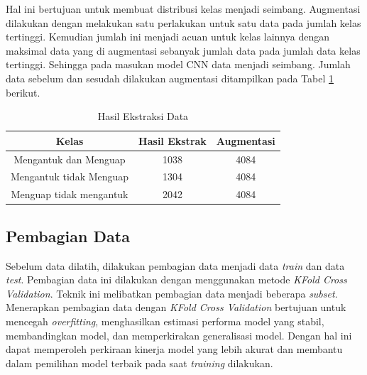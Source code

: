      
        
        Hal ini bertujuan untuk membuat distribusi kelas menjadi seimbang. Augmentasi dilakukan dengan melakukan satu perlakukan untuk satu data pada jumlah kelas tertinggi. Kemudian jumlah ini menjadi acuan untuk kelas lainnya dengan maksimal data yang di augmentasi sebanyak jumlah data pada jumlah data kelas tertinggi. Sehingga pada masukan model CNN data menjadi seimbang. Jumlah data sebelum dan sesudah dilakukan augmentasi ditampilkan pada Tabel \ref{Hasil Augmentasi Data} berikut.
    


            \begin{table}[H]
            \centering
            \caption{Hasil Ekstraksi Data}
            \begin{tabular}{ccc}
                \toprule
                \textbf{Kelas} & \textbf{Hasil Ekstrak} & \textbf{Augmentasi }\\
                \midrule
                      
                           Mengantuk dan Menguap & 1038 & 4084 \\
                          Mengantuk tidak Menguap & 1304 & 4084 \\
                           Menguap tidak mengantuk& 2042 & 4084 \\
                
                    \bottomrule
                \end{tabular}
                \label{Hasil Augmentasi Data}
            \end{table}




    
    \subsection{Pembagian Data}
    
    Sebelum data dilatih, dilakukan pembagian data menjadi data 
    \textit{train} dan data \textit{test}. Pembagian data ini 
    dilakukan dengan menggunakan metode \textit{KFold Cross Validation}. 
    Teknik ini melibatkan pembagian data menjadi beberapa \textit{subset}. 
    Menerapkan pembagian data dengan \textit{KFold Cross Validation} 
    bertujuan untuk mencegah \textit{overfitting}, 
    menghasilkan estimasi performa model yang stabil, 
    membandingkan model, dan memperkirakan generalisasi model. 
    Dengan hal ini dapat memperoleh perkiraan kinerja model yang 
    lebih akurat dan membantu dalam pemilihan model terbaik pada 
    saat \textit{training} dilakukan. 
    
